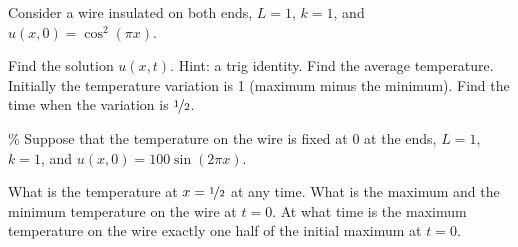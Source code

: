 \documentclass{ximera}
\begin{document}
\begin{exercise}
    Consider a wire insulated on both ends, $L=1$, $k=1$, and $u(x,0) = \cos^2(\pi x)$.
    \begin{tasks}
        \task Find the solution $u(x,t)$.  Hint: a trig identity.
        \task Find the average temperature.
        \task Initially the temperature variation is 1 (maximum minus the minimum). Find the time when the variation is $\nicefrac{1}{2}$.
    \end{tasks}
\end{exercise}

\begin{exercise}\%
    Suppose that the temperature on the wire is fixed at $0$ at the ends, $L=1$, $k=1$, and $u(x,0) = 100\sin(2 \pi x)$.
    \begin{tasks}
        \task What is the temperature at $x = \nicefrac{1}{2}$ at any time.
        \task What is the maximum and the minimum temperature on the wire at $t=0$.
        \task At what time is the maximum temperature on the wire exactly one half of the initial maximum at $t=0$.
    \end{tasks}
\end{exercise}
\end{document}
